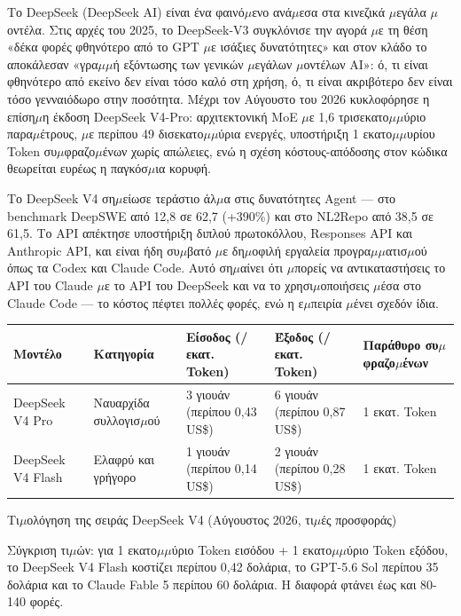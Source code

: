 
Το DeepSeek (DeepSeek AI) είναι ένα φαινό$\mu$ενο ανά$\mu$εσα στα κινεζικά $\mu$εγάλα $\mu$οντέλα. Στις αρχές του 2025, το DeepSeek-V3 συγκλόνισε την αγορά $\mu$ε τη θέση «δέκα φορές φθηνότερο από το GPT $\mu$ε ισάξιες δυνατότητες» και στον κλάδο το αποκάλεσαν «γρα$\mu$$\mu$ή εξόντωσης των γενικών $\mu$εγάλων $\mu$οντέλων AI»: ό, τι είναι φθηνότερο από εκείνο δεν είναι τόσο καλό στη χρήση, ό, τι είναι ακριβότερο δεν είναι τόσο γενναιόδωρο στην ποσότητα. Μέχρι τον Αύγουστο του 2026 κυκλοφόρησε η επίση$\mu$η έκδοση DeepSeek V4-Pro: αρχιτεκτονική MoE $\mu$ε 1,6 τρισεκατο$\mu$$\mu$ύριο παρα$\mu$έτρους, $\mu$ε περίπου 49 δισεκατο$\mu$$\mu$ύρια ενεργές, υποστήριξη 1 εκατο$\mu$$\mu$υρίου Token συ$\mu$φραζο$\mu$ένων χωρίς απώλειες, ενώ η σχέση κόστους-απόδοσης στον κώδικα θεωρείται ευρέως η παγκόσ$\mu$ια κορυφή.

Το DeepSeek V4 ση$\mu$είωσε τεράστιο άλ$\mu$α στις δυνατότητες Agent — στο benchmark DeepSWE από 12,8 σε 62,7 (+390\%) και στο NL2Repo από 38,5 σε 61,5. Το API απέκτησε υποστήριξη διπλού πρωτοκόλλου, Responses API και Anthropic API, και είναι ήδη συ$\mu$βατό $\mu$ε δη$\mu$οφιλή εργαλεία προγρα$\mu$$\mu$ατισ$\mu$ού όπως τα Codex και Claude Code. Αυτό ση$\mu$αίνει ότι $\mu$πορείς να αντικαταστήσεις το API του Claude $\mu$ε το API του DeepSeek και να το χρησι$\mu$οποιήσεις $\mu$έσα στο Claude Code — το κόστος πέφτει πολλές φορές, ενώ η ε$\mu$πειρία $\mu$ένει σχεδόν ίδια.

\begin{center}
\begin{tabularx}{\linewidth}{|X|X|X|X|X|}
\hline
\textbf{Μοντέλο} & \textbf{Κατηγορία} & \textbf{Είσοδος (/εκατ. Token)} & \textbf{Έξοδος (/εκατ. Token)} & \textbf{Παράθυρο συ$\mu$φραζο$\mu$ένων} \tabularnewline
\hline
DeepSeek V4 Pro & Ναυαρχίδα συλλογισ$\mu$ού & 3 γιουάν (περίπου 0,43 US\$) & 6 γιουάν (περίπου 0,87 US\$) & 1 εκατ. Token \tabularnewline
DeepSeek V4 Flash & Ελαφρύ και γρήγορο & 1 γιουάν (περίπου 0,14 US\$) & 2 γιουάν (περίπου 0,28 US\$) & 1 εκατ. Token \tabularnewline
\hline
\end{tabularx}
\end{center}

\begin{center}\small\color{gray}Τι$\mu$ολόγηση της σειράς DeepSeek V4 (Αύγουστος 2026, τι$\mu$ές προσφοράς)\end{center}

Σύγκριση τι$\mu$ών: για 1 εκατο$\mu$$\mu$ύριο Token εισόδου + 1 εκατο$\mu$$\mu$ύριο Token εξόδου, το DeepSeek V4 Flash κοστίζει περίπου 0,42 δολάρια, το GPT-5.6 Sol περίπου 35 δολάρια και το Claude Fable 5 περίπου 60 δολάρια. Η διαφορά φτάνει έως και 80-140 φορές.

